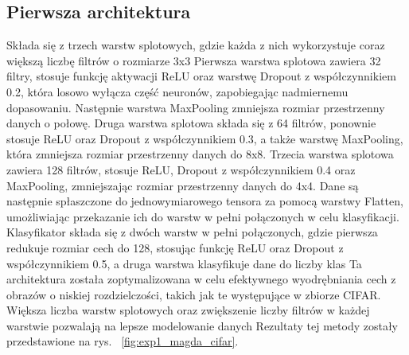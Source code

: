 \documentclass[10pt]{article}
\begin{document}
\subsection*{Pierwsza architektura}
Składa się z trzech warstw splotowych, gdzie każda z nich wykorzystuje coraz większą liczbę filtrów o rozmiarze 3x3
Pierwsza warstwa splotowa zawiera 32 filtry, stosuje funkcję aktywacji ReLU oraz warstwę Dropout z współczynnikiem 0.2, która losowo wyłącza część neuronów, zapobiegając nadmiernemu dopasowaniu. Następnie warstwa MaxPooling zmniejsza rozmiar przestrzenny danych o połowę. Druga warstwa splotowa składa się z 64 filtrów, ponownie stosuje ReLU oraz Dropout z współczynnikiem 0.3, a także warstwę MaxPooling, która zmniejsza rozmiar przestrzenny danych do 8x8. Trzecia warstwa splotowa zawiera 128 filtrów, stosuje ReLU, Dropout z współczynnikiem 0.4 oraz MaxPooling, zmniejszając rozmiar przestrzenny danych do 4x4. Dane są następnie spłaszczone do jednowymiarowego tensora za pomocą warstwy Flatten, umożliwiając przekazanie ich do warstw w pełni połączonych w celu klasyfikacji. Klasyfikator składa się z dwóch warstw w pełni połączonych, gdzie pierwsza redukuje rozmiar cech do 128, stosując funkcję ReLU oraz Dropout z współczynnikiem 0.5, a druga warstwa klasyfikuje dane do liczby klas
Ta architektura została zoptymalizowana w celu efektywnego wyodrębniania cech z obrazów o niskiej rozdzielczości, takich jak te występujące w zbiorze CIFAR. Większa liczba warstw splotowych oraz zwiększenie liczby filtrów w każdej warstwie pozwalają na lepsze modelowanie danych
Rezultaty tej metody zostały przedstawione na rys. ~\ref{fig:exp1_magda_cifar}.

\MagdaCifarLarge{}
\end{document}
